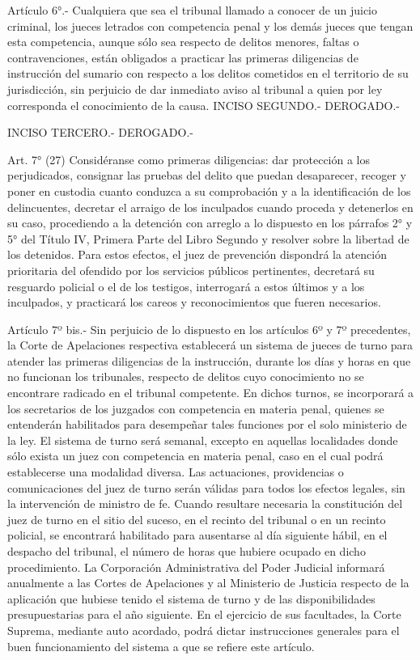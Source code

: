     Artículo 6°.- Cualquiera que sea el tribunal llamado a conocer de un juicio criminal, los jueces letrados con competencia penal y los demás jueces que tengan esta competencia, aunque sólo sea respecto de delitos menores, faltas o contravenciones, están obligados a practicar las primeras diligencias de instrucción del sumario con respecto a los delitos cometidos en el territorio de su jurisdicción, sin perjuicio de dar inmediato aviso al tribunal a quien por ley corresponda el conocimiento de la causa.
    INCISO SEGUNDO.- DEROGADO.-

    INCISO TERCERO.- DEROGADO.-

    Art. 7° (27) Considéranse como primeras diligencias: dar protección a los perjudicados, consignar las pruebas del delito que puedan desaparecer, recoger y poner en custodia cuanto conduzca a su comprobación y a la identificación de los delincuentes, decretar el arraigo de los inculpados cuando proceda y detenerlos en su caso, procediendo a la detención con arreglo a lo dispuesto en los párrafos 2° y 5° del Título IV, Primera Parte del Libro Segundo y resolver sobre la libertad de los detenidos.
    Para estos efectos, el juez de prevención dispondrá la atención prioritaria del ofendido por los servicios públicos pertinentes, decretará su resguardo policial o el de los testigos, interrogará a estos últimos y a los inculpados, y practicará los careos y reconocimientos que fueren necesarios.

    Artículo 7º bis.- Sin perjuicio de lo dispuesto en los artículos 6º y 7º precedentes, la Corte de Apelaciones respectiva establecerá un sistema de jueces de turno para atender las primeras diligencias de la instrucción, durante los días y horas en que no funcionan los tribunales, respecto de delitos cuyo conocimiento no se encontrare radicado en el tribunal competente.
    En dichos turnos, se incorporará a los secretarios de los juzgados con competencia en materia penal, quienes se entenderán habilitados para desempeñar tales funciones por el solo ministerio de la ley.
    El sistema de turno será semanal, excepto en aquellas localidades donde sólo exista un juez con competencia en materia penal, caso en el cual podrá establecerse una modalidad diversa.
    Las actuaciones, providencias o comunicaciones del juez de turno serán válidas para todos los efectos legales, sin la intervención de ministro de fe.
    Cuando resultare necesaria la constitución del juez de turno en el sitio del suceso, en el recinto del tribunal o en un recinto policial, se encontrará habilitado para ausentarse al día siguiente hábil, en el despacho del tribunal, el número de horas que hubiere ocupado en dicho procedimiento.
    La Corporación Administrativa del Poder Judicial informará anualmente a las Cortes de Apelaciones y al Ministerio de Justicia respecto de la aplicación que hubiese tenido el sistema de turno y de las disponibilidades presupuestarias para el año siguiente.
    En el ejercicio de sus facultades, la Corte Suprema, mediante auto acordado, podrá dictar instrucciones generales para el buen funcionamiento del sistema a que se refiere este artículo.


